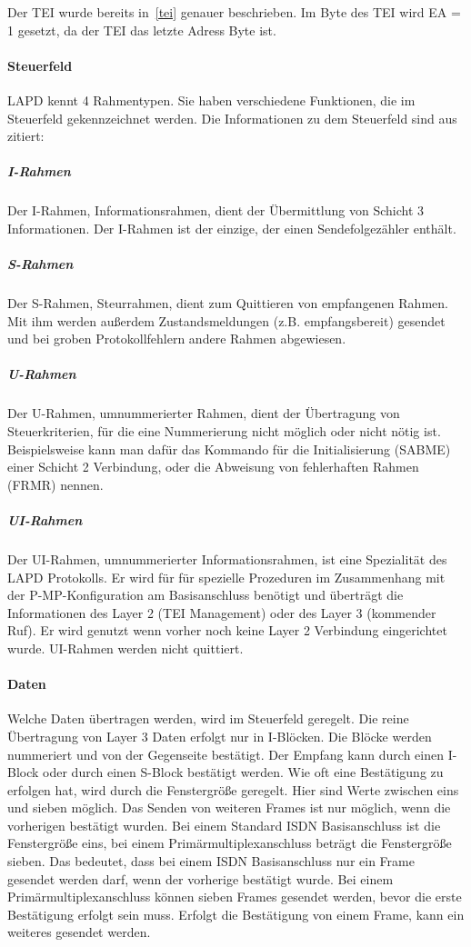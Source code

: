 \documentclass[12pt, a4paper, ngerman]{article}
\begin{document}
Der TEI wurde bereits in~\ref{tei} genauer beschrieben. Im Byte des TEI wird EA = 1 gesetzt, da der TEI das letzte Adress Byte ist.

\paragraph{Steuerfeld}
LAPD kennt 4 Rahmentypen. Sie haben verschiedene Funktionen, die im Steuerfeld gekennzeichnet werden. Die Informationen zu dem Steuerfeld sind aus \cite{SWB-098672061} zitiert:

\subparagraph{I-Rahmen}
Der I-Rahmen, Informationsrahmen, dient der Übermittlung von Schicht 3 Informationen. Der I-Rahmen ist der einzige, der einen Sendefolgezähler enthält.

\subparagraph{S-Rahmen}
Der S-Rahmen, Steurrahmen, dient zum Quittieren von empfangenen Rahmen. Mit ihm werden außerdem Zustandsmeldungen (z.B. empfangsbereit) gesendet und bei groben Protokollfehlern andere Rahmen abgewiesen.

\subparagraph{U-Rahmen}
Der U-Rahmen, umnummerierter Rahmen, dient der Übertragung von Steuerkriterien, für die eine Nummerierung nicht möglich oder nicht nötig ist. Beispielsweise kann man dafür das Kommando für die Initialisierung (SABME) einer Schicht 2 Verbindung, oder die Abweisung von fehlerhaften Rahmen (FRMR) nennen.

\subparagraph{UI-Rahmen}
Der UI-Rahmen, umnummerierter Informationsrahmen, ist eine Spezialität des LAPD Protokolls. Er wird für für spezielle Prozeduren im Zusammenhang mit der P-MP-Konfiguration am Basisanschluss benötigt und überträgt die Informationen des Layer 2 (TEI Management) oder des Layer 3 (kommender Ruf). Er wird genutzt wenn vorher noch keine Layer 2 Verbindung eingerichtet wurde. UI-Rahmen werden nicht quittiert.

\paragraph{Daten}
Welche Daten übertragen werden, wird im Steuerfeld geregelt. Die reine Übertragung von Layer 3 Daten erfolgt nur in I-Blöcken. Die Blöcke werden nummeriert und von der Gegenseite bestätigt. Der Empfang kann durch einen I-Block oder durch einen S-Block bestätigt werden. Wie oft eine Bestätigung zu erfolgen hat, wird durch die Fenstergröße geregelt. Hier sind Werte zwischen eins und sieben möglich. Das Senden von weiteren Frames ist nur möglich, wenn die vorherigen bestätigt wurden. Bei einem Standard ISDN Basisanschluss ist die Fenstergröße eins, bei einem Primärmultiplexanschluss beträgt die Fenstergröße sieben. Das bedeutet, dass bei einem ISDN Basisanschluss nur ein Frame gesendet werden darf, wenn der vorherige bestätigt wurde. Bei einem Primärmultiplexanschluss können sieben Frames gesendet werden, bevor die erste Bestätigung erfolgt sein muss. Erfolgt die Bestätigung von einem Frame, kann ein weiteres gesendet werden.
\end{document}
